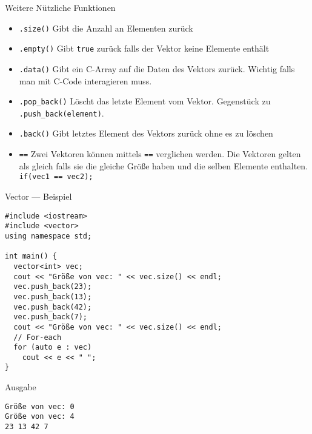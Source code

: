 \documentclass[presentation]{beamer}
\begin{document}
\begin{frame}[label={sec:org638c65e},fragile]{Weitere Nützliche Funktionen}
 \begin{itemize}
\item {\color{solarizedYellow}\verb!.size()!} Gibt die Anzahl an Elementen zurück
\item {\color{solarizedYellow}\verb!.empty()!} Gibt {\color{solarizedYellow}\verb!true!} zurück falls der Vektor keine Elemente enthält
\item {\color{solarizedYellow}\verb!.data()!} Gibt ein C-Array auf die Daten des Vektors zurück. Wichtig
falls man mit C-Code interagieren muss.
\item {\color{solarizedYellow}\verb!.pop_back()!} Löscht das letzte Element vom Vektor. Gegenstück zu
{\color{solarizedYellow}\verb!.push_back(element)!}.
\item {\color{solarizedYellow}\verb!.back()!} Gibt letztes Element des Vektors zurück ohne es zu löschen
\item {\color{solarizedYellow}\verb!==!} Zwei Vektoren können mittels {\color{solarizedYellow}\verb!==!} verglichen werden. Die
Vektoren gelten als gleich falls sie die gleiche Größe haben und die
selben Elemente enthalten. {\color{solarizedYellow}\verb!if(vec1 == vec2);!}
\end{itemize}
\end{frame}
\begin{frame}[label={sec:org2aee91f},fragile]{Vector --- Beispiel}
 \begin{verbatim}
#include <iostream>
#include <vector>
using namespace std;

int main() {
  vector<int> vec;
  cout << "Größe von vec: " << vec.size() << endl;
  vec.push_back(23);
  vec.push_back(13);
  vec.push_back(42);
  vec.push_back(7);
  cout << "Größe von vec: " << vec.size() << endl;
  // For-each 
  for (auto e : vec)
    cout << e << " ";
}
\end{verbatim}
\begin{block}{Ausgabe}
\begin{verbatim}
Größe von vec: 0
Größe von vec: 4
23 13 42 7 
\end{verbatim}
\end{block}
\end{frame}
\end{document}

